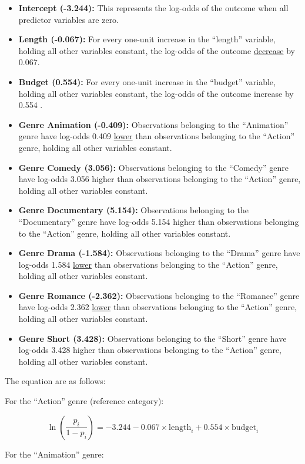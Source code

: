 \documentclass[
  letterpaper,
  DIV=11,
  numbers=noendperiod]{scrartcl}
\begin{document}
\begin{itemize}
\item
  \textbf{Intercept (-3.244):} This represents the log-odds of the
  outcome when all predictor variables are zero.
\item
  \textbf{Length (-0.067):} For every one-unit increase in the
  ``length'' variable, holding all other variables constant, the
  log-odds of the outcome \ul{decrease} by 0.067.
\item
  \textbf{Budget (0.554):} For every one-unit increase in the ``budget''
  variable, holding all other variables constant, the log-odds of the
  outcome increase by 0.554 .
\item
  \textbf{Genre Animation (-0.409):} Observations belonging to the
  ``Animation'' genre have log-odds 0.409 \ul{lower} than observations
  belonging to the ``Action'' genre, holding all other variables
  constant.
\item
  \textbf{Genre Comedy (3.056):} Observations belonging to the
  ``Comedy'' genre have log-odds 3.056 higher than observations
  belonging to the ``Action'' genre, holding all other variables
  constant.
\item
  \textbf{Genre Documentary (5.154):} Observations belonging to the
  ``Documentary'' genre have log-odds 5.154 higher than observations
  belonging to the ``Action'' genre, holding all other variables
  constant.
\item
  \textbf{Genre Drama (-1.584):} Observations belonging to the ``Drama''
  genre have log-odds 1.584 \ul{lower} than observations belonging to
  the ``Action'' genre, holding all other variables constant.
\item
  \textbf{Genre Romance (-2.362):} Observations belonging to the
  ``Romance'' genre have log-odds 2.362 \ul{lower} than observations
  belonging to the ``Action'' genre, holding all other variables
  constant.
\item
  \textbf{Genre Short (3.428):} Observations belonging to the ``Short''
  genre have log-odds 3.428 higher than observations belonging to the
  ``Action'' genre, holding all other variables constant.
\end{itemize}

The equation are as follows:

For the ``Action'' genre (reference category):

\[\ln\left(\frac{p_i}{1-p_i}\right) = -3.244 - 0.067 \times \textrm{length}_i + 0.554 \times \textrm{budget}_i\]

For the ``Animation'' genre:
\end{document}
